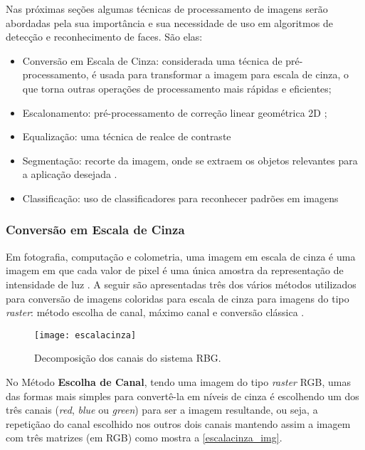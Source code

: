 Nas próximas seções algumas técnicas de processamento de imagens serão abordadas pela sua importância e sua necessidade de uso em algoritmos de detecção e reconhecimento de faces. São elas:

\begin{itemize}
	\item Conversão em Escala de Cinza: considerada uma técnica de pré-processamento, é usada para transformar a imagem para  escala de cinza, o que torna outras operações de processamento mais rápidas e eficientes;
	\item Escalonamento: pré-processamento de correção linear geométrica 2D \cite{lapix_escala};
	\item Equalização: uma técnica de realce de contraste \cite{gonzalez_woods}
	\item Segmentação: recorte da imagem, onde se extraem os objetos relevantes para a aplicação desejada \cite{inpe_proc_img}.
	\item Classificação: uso de classificadores para reconhecer padrões em imagens \cite{drmathew_java_programming}
\end{itemize}

\subsubsection{Conversão em Escala de Cinza}\label{subsubsec:filtros}

Em fotografia, computação e colometria, uma imagem em escala de cinza é uma imagem em que cada valor de pixel é uma única amostra da representação de intensidade de luz \cite{stephen_greyscale}. A seguir são apresentadas três dos vários métodos utilizados para conversão de imagens coloridas para escala de cinza para imagens do tipo \textit{raster}: método escolha de canal, máximo canal e conversão clássica \cite{ricardo_pdi}.

\begin{figure}[h]
	\centering
	\texttt{[image: escalacinza]}
	\caption{Decomposição dos canais do sistema RBG. }
	\label{escalacinza_img}
\end{figure}

No Método \textbf{Escolha de Canal}, tendo uma imagem do tipo \textit{raster} RGB, umas das formas mais simples para convertê-la em níveis de cinza é escolhendo um dos três canais (\textit{red}, \textit{blue} ou \textit{green}) para ser a imagem resultande, ou seja, a repetiçãao do canal escolhido nos outros dois canais mantendo assim a imagem com três matrizes (em RGB) como mostra a \autoref{escalacinza_img}.	


